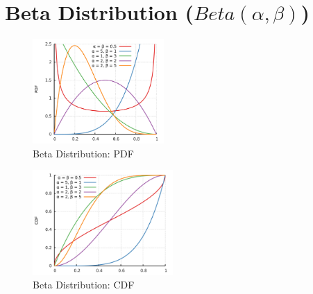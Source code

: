\chapter{Beta Distribution ($Beta(\alpha, \beta)$) \cite{ism-1,wiki/Beta_distribution,mfml-1}} \label{Beta Distribution}


\begin{table}[H]
    \begin{minipage}{0.49\linewidth}
        \begin{figure}[H]
            \centering
            \includegraphics[width=\linewidth, height=4cm, keepaspectratio]{Pictures/distributions/Beta_distribution_pdf.jpg}
            \caption{Beta Distribution: PDF}
        \end{figure}
    \end{minipage}
    \hfill
    \begin{minipage}{0.49\linewidth}
        \begin{figure}[H]
            \centering
            \includegraphics[width=\linewidth, height=4cm, keepaspectratio]{Pictures/distributions/Beta_distribution_cdf.jpg}
            \caption{Beta Distribution: CDF}
        \end{figure}
    \end{minipage}
\end{table}


